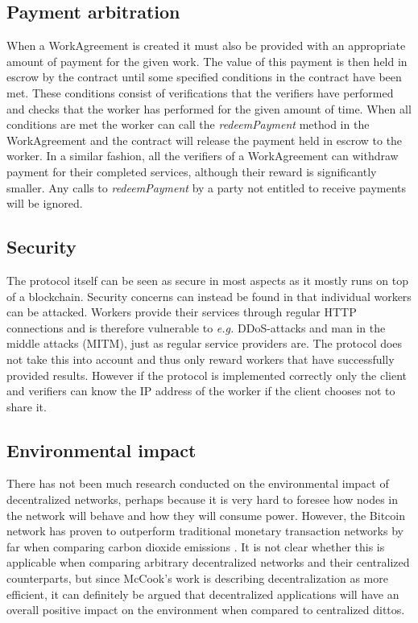 \subsection{Payment arbitration}
When a WorkAgreement is created it must also be provided with an appropriate amount of payment for the given work. The value of this payment is then held in escrow by the contract until some specified conditions in the contract have been met. These conditions consist of verifications that the verifiers have performed and checks that the worker has performed for the given amount of time. When all conditions are met the worker can call the \textit{redeemPayment} method in the WorkAgreement and the contract will release the payment held in escrow to the worker. In a similar fashion, all the verifiers of a WorkAgreement can withdraw payment for their completed services, although their reward is significantly smaller. Any calls to \textit{redeemPayment} by a party not entitled to receive payments will be ignored.

\subsection{Security}
The protocol itself can be seen as secure in most aspects as it mostly runs on top of a blockchain. Security concerns can instead be found in that individual workers can be attacked. Workers provide their services through regular HTTP connections and is therefore vulnerable to \textit{e.g.} DDoS-attacks and man in the middle attacks (MITM), just as regular service providers are. The protocol does not take this into account and thus only reward workers that have successfully provided results. However if the protocol is implemented correctly only the client and verifiers can know the IP address of the worker if the client chooses not to share it.

\subsection{Environmental impact}
There has not been much research conducted on the environmental impact of decentralized networks, perhaps because it is very hard to foresee how nodes in the network will behave and how they will consume power. However, the Bitcoin network has proven to outperform traditional monetary transaction networks by far when comparing carbon dioxide emissions \cite{cook}. It is not clear whether this is applicable when comparing arbitrary decentralized networks and their centralized counterparts, but since McCook's work is describing decentralization as more efficient, it can definitely be argued that decentralized applications will have an overall positive impact on the environment when compared to centralized dittos.

